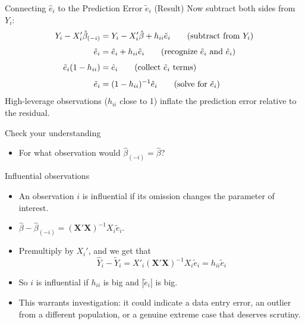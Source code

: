 \documentclass[aspectratio=169, handout, t]{beamer}
\numberwithin{equation}{section}
\begin{document}
\begin{frame}{Connecting $\hat{e}_i$ to the Prediction Error $\tilde{e}_i$ (Result)}
Now subtract both sides from $Y_i$:
\begin{align*}
Y_i-X_i'\hat{\beta}_{(-i)}&=Y_i-X_i'\hat{\beta}+h_{ii}\tilde{e}_i \tag{subtract from $Y_i$}\\[4pt]
\tilde{e}_i&=\hat{e}_i+h_{ii}\tilde{e}_i \tag{recognize $\tilde{e}_i$ and $\hat{e}_i$}\\[4pt]
\tilde{e}_i(1-h_{ii})&=\hat{e}_i \tag{collect $\tilde{e}_i$ terms}\\[4pt]
\tilde{e}_i&=(1-h_{ii})^{-1}\hat{e}_i \tag{solve for $\tilde{e}_i$}
\end{align*}
High-leverage observations ($h_{ii}$ close to 1) inflate the prediction error relative to the residual.
\end{frame}


\begin{frame}{Check your understanding}
\begin{itemize}
\item For what observation would $\hat{\beta}_{(-i)}=\hat{\beta}$?
\end{itemize}
\end{frame}

\begin{frame}{Influential observations}
\begin{itemize}
\item An observation $i$ is influential if its omission changes the parameter of interest.
\item $\hat{\beta}- \hat{\beta}_{(-i)}=(\bm{X}'\bm{X})^{-1}X_i\tilde{e}_i$.
\item Premultiply by $X_i'$, and we get that 
$$\hat{Y}_i-\tilde{Y}_i=X'_i(\bm{X}'\bm{X})^{-1}X_i\tilde{e}_i=h_{ii}\tilde{e}_i$$
\item So $i$ is influential if $h_{ii}$ is big and $|\tilde{e}_i|$ is big.
\item This warrants investigation: it could indicate a data entry error, an outlier from a different population, or a genuine extreme case that deserves scrutiny.
\end{itemize}
\end{frame}
\end{document}
